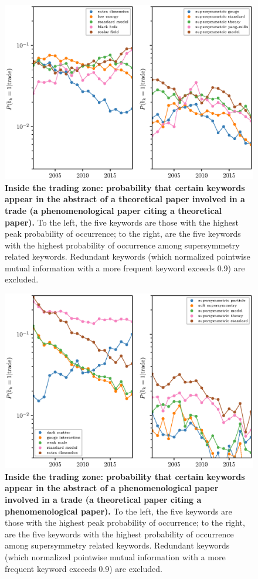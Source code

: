 \documentclass[smallextended]{svjour3}
\begin{document}
\begin{figure}
    \centering
    \includegraphics{Fig6.eps}
    \caption{\textbf{Inside the trading zone: probability that certain keywords appear in the abstract of a theoretical paper involved in a trade (a phenomenological paper citing a theoretical paper).} To the left, the five keywords are those with the highest peak probability of occurrence; to the right, are the five keywords with the highest probability of occurrence among supersymmetry related keywords. Redundant keywords (which normalized pointwise mutual information with a more frequent keyword exceeds 0.9) are excluded.} 
    \label{fig:cross_citations_probs_th_ph}
\end{figure}

\begin{figure}
    \centering
    \includegraphics{Fig7.eps}
    \caption{\textbf{Inside the trading zone: probability that certain keywords appear in the abstract of a phenomenological paper involved in a trade (a theoretical paper citing a phenomenological paper).} To the left, the five keywords are those with the highest peak probability of occurrence; to the right, are the five keywords with the highest probability of occurrence among supersymmetry related keywords. Redundant keywords (which normalized pointwise mutual information with a more frequent keyword exceeds 0.9) are excluded.} 
    \label{fig:cross_citations_probs_ph_th}
\end{figure}
\end{document}
